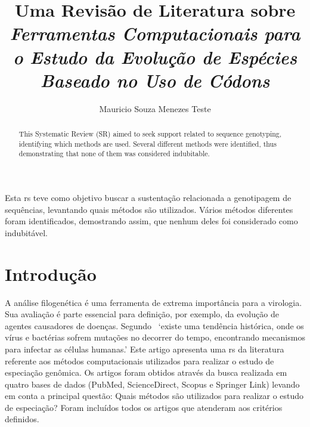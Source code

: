\documentclass[12pt]{article}
\title{Uma Revisão de Literatura sobre \textit{Ferramentas Computacionais para
        o Estudo da Evolução de Espécies Baseado no Uso de Códons}}
\author{Mauricio Souza Menezes Teste\\}
\begin{document}

\maketitle

\begin{resumo}
    Esta \gls{rs} teve como objetivo buscar a sustentação relacionada a genotipagem de sequências, levantando quais métodos são utilizados.
    Vários métodos diferentes foram identificados, demostrando assim, que nenhum deles foi considerado como indubitável.
\end{resumo}

\begin{abstract}
    \begin{otherlanguage}{english}
        This Systematic Review (SR) aimed to seek support related to sequence genotyping, identifying which methods are used. Several different methods were identified, thus demonstrating that none of them was considered indubitable.
    \end{otherlanguage}
\end{abstract}

\section{Introdução}

A análise filogenética é uma ferramenta de extrema importância para a virologia. Sua avaliação é parte essencial para definição, por exemplo, da evolução de agentes causadores de doenças.
Segundo~\cite{behl_threat_2022} `existe uma tendência histórica, onde os vírus e bactérias sofrem mutações no decorrer do tempo, encontrando mecanismos para infectar as células humanas.'
Este artigo apresenta uma \gls{rs} da literatura referente aos métodos computacionais utilizados para realizar o estudo de especiação genômica. Os artigos foram obtidos através da busca realizada em quatro bases de dados (PubMed, ScienceDirect, Scopus e Springer Link) levando em conta a principal questão: Quais métodos são utilizados para realizar o estudo de especiação? Foram incluídos todos os artigos que atenderam aos critérios definidos.
\end{document}
